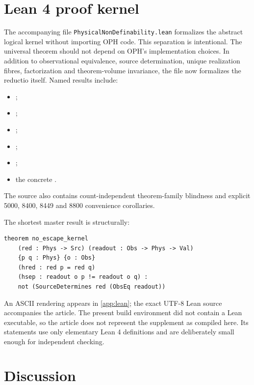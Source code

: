 \documentclass[10pt,a4paper]{article}
\theoremstyle{definition}
\theoremstyle{remark}
\begin{document}
\section{Lean 4 proof kernel}
\label{sec:lean}

The accompanying file \texttt{PhysicalNonDefinability.lean} formalizes the
abstract logical kernel without importing OPH code.  This separation is
intentional.  The universal theorem should not depend on OPH's implementation
choices.  In addition to observational equivalence, source determination,
unique realization fibres, factorization and theorem-volume invariance, the
file now formalizes the reductio itself.  Named results include:
\begin{itemize}
\item {};
\item {};
\item {};
\item {};
\item {};
\item the concrete .
\end{itemize}
The source also contains count-independent theorem-family blindness and
explicit 5000, 8400, 8449 and 8800 convenience corollaries.

The shortest master result is structurally:

\begin{lstlisting}
theorem no_escape_kernel
    (red : Phys -> Src) (readout : Obs -> Phys -> Val)
    {p q : Phys} {o : Obs}
    (hred : red p = red q)
    (hsep : readout o p != readout o q) :
    not (SourceDetermines red (ObsEq readout))
\end{lstlisting}

An ASCII rendering appears in \cref{app:lean}; the exact UTF-8 Lean source accompanies the article.  The present build
environment did not contain a Lean executable, so the article does not
represent the supplement as compiled here.  Its statements use only elementary
Lean 4 definitions and are deliberately small enough for independent checking.

\section{Discussion}
\end{document}
